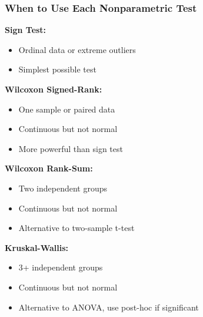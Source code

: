 \documentclass{beamer}
\begin{document}
\begin{frame}
\frametitle{When to Use Each Nonparametric Test}

\textbf{Sign Test:}
\begin{itemize}\setlength\itemsep{-0.2em}
\item Ordinal data or extreme outliers
\item Simplest possible test
\end{itemize}

\vspace{0.2cm}
\textbf{Wilcoxon Signed-Rank:}
\begin{itemize}\setlength\itemsep{-0.2em}
\item One sample or paired data
\item Continuous but not normal
\item More powerful than sign test
\end{itemize}

\vspace{0.2cm}
\textbf{Wilcoxon Rank-Sum:}
\begin{itemize}\setlength\itemsep{-0.2em}
\item Two independent groups
\item Continuous but not normal
\item Alternative to two-sample t-test
\end{itemize}

\vspace{0.2cm}
\textbf{Kruskal-Wallis:}
\begin{itemize}\setlength\itemsep{-0.2em}
\item 3+ independent groups
\item Continuous but not normal
\item Alternative to ANOVA, use post-hoc if significant
\end{itemize}
\end{frame}
\end{document}
